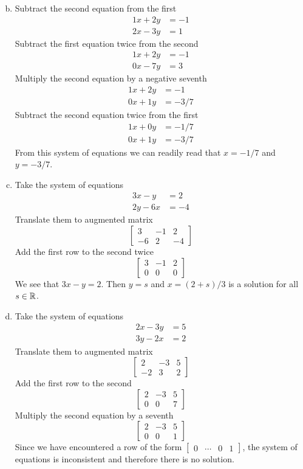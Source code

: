 \documentclass[../main.tex]{subfiles}
\begin{document}
\solution
\begin{enumerate}[a)]
	\setcounter{enumi}{1}
	\item Subtract the second equation from the first
		\begin{align*}
			1x + 2y &= -1 \\
			2x - 3y &= 1
		\end{align*}
		Subtract the first equation twice from the second
		\begin{align*}
			1x + 2y &= -1 \\
			0x - 7y &= 3
		\end{align*}
		Multiply the second equation by a negative seventh
		\begin{align*}
			1x + 2y &= -1 \\
			0x + 1y &= -3/7
		\end{align*}
		Subtract the second equation twice from the first
		\begin{align*}
			1x + 0y &= -1/7 \\
			0x + 1y &= -3/7
		\end{align*}
		From this system of equations we can readily read that $x = -1/7$ and $y = -3/7$.
	\setcounter{enumi}{3}
	\item 
		Take the system of equations
		\begin{align*}
			3x - y &= 2 \\
			2y - 6x &= -4
		\end{align*}
		Translate them to augmented matrix
		$$\left[\begin{array}{cc|c}
			3 & -1 & 2 \\
			-6 & 2 & -4
		\end{array}\right]$$
		Add the first row to the second twice
		$$\left[\begin{array}{cc|c}
			3 & -1 & 2 \\
			0 & 0 & 0
		\end{array}\right]$$
		We see that $3x - y = 2$.
		Then $y = s$ and $x = (2 + s)/3$ is a solution for all $s \in \operatorname{\mathbb{R}}$.
	\setcounter{enumi}{5}
	\item 
		Take the system of equations
		\begin{align*}
			2x - 3y &= 5 \\
			3y - 2x &= 2
		\end{align*}
		Translate them to augmented matrix
		$$\left[\begin{array}{cc|c}
			2 & -3 & 5 \\
			-2 & 3 & 2
		\end{array}\right]$$
		Add the first row to the second
		$$\left[\begin{array}{cc|c}
			2 & -3 & 5 \\
			0 & 0 & 7
		\end{array}\right]$$
		Multiply the second equation by a seventh
		$$\left[\begin{array}{cc|c}
			2 & -3 & 5 \\
			0 & 0 & 1
		\end{array}\right]$$
		Since we have encountered a row of the form $\left[\begin{array}{ccc|c}0&\cdots&0&1\end{array}\right]$, the system of equations is inconsistent and therefore there is no solution.
\end{enumerate}
\end{document}
